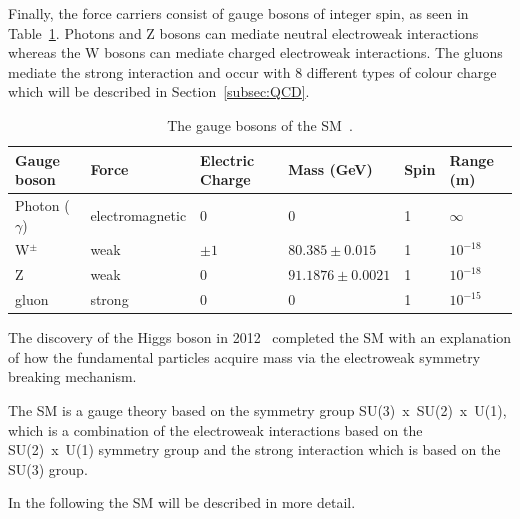 Finally, the force carriers consist of gauge bosons of integer spin, as seen in Table~\ref{table:SMbosons}. Photons and Z bosons can mediate neutral electroweak interactions whereas the W bosons can mediate charged electroweak interactions. The gluons mediate the strong interaction and occur with 8 different types of colour charge which will be described in Section~\ref{subsec:QCD}. 
\begin{table}[ht!]
\centering
\footnotesize
\begin{tabular}{|l|l|l|l|l|l|}
\hline
Gauge boson                       & Force           & Electric Charge & Mass (GeV) & Spin & Range (m)  \\ \hline \hline
Photon ($\gamma$)                 & electromagnetic & 0      & 0          & 1    & $\infty$   \\ \hline
W$^{\pm}$                         & weak            & $\pm1$ & $80.385\pm0.015$           & 1    & $10^{-18}$ \\ \hline
Z                                 & weak            & 0      & $91.1876\pm0.0021$           & 1    & $10^{-18}$ \\ \hline
gluon                             & strong          & 0      & 0          & 1    & $10^{-15}$ \\ \hline
\end{tabular}
\caption{The gauge bosons of the SM~\cite{PDG2016}.}
\label{table:SMbosons}

\end{table}

The discovery of the Higgs boson in 2012~\cite{Higgs2012observation,Aad:2012tfa,Aad:2015zhl} completed the SM with an explanation of how the fundamental particles acquire mass via the electroweak symmetry breaking mechanism.

The SM is a gauge theory based on the symmetry group SU(3)~x~SU(2)~x~U(1), which is a combination of the electroweak interactions based on the SU(2)~x~U(1) symmetry group and the strong interaction which is based on the SU(3) group.

In the following the SM will be described in more detail.

